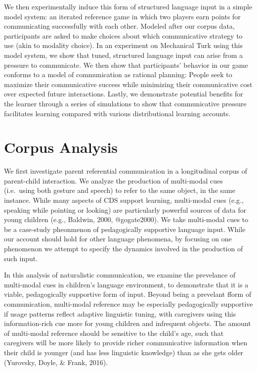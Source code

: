 \documentclass[english,,man,floatsintext]{apa6}
\begin{document}
We then experimentally induce this form of structured language input in a simple model system: an iterated reference game in which two players earn points for communicating successfully with each other. Modeled after our corpus data, participants are asked to make choices about which communicative strategy to use (akin to modality choice). In an experiment on Mechanical Turk using this model system, we show that tuned, structured language input can arise from a pressure to communicate. We then show that participants' behavior in our game conforms to a model of communication as rational planning: People seek to maximize their communicative success while minimizing their communicative cost over expected future interactions. Lastly, we demonstrate potential benefits for the learner through a series of simulations to show that communicative pressure facilitates learning compared with various distributional learning accounts.

\hypertarget{corpus-analysis}{%
\section{Corpus Analysis}\label{corpus-analysis}}

We first investigate parent referential communication in a longitudinal corpus of parent-child interaction. We analyze the production of multi-modal cues (i.e.~using both gesture and speech) to refer to the same object, in the same instance. While many aspects of CDS support learning, multi-modal cues (e.g., speaking while pointing or looking) are particularly powerful sources of data for young children (e.g., Baldwin, 2000, @gogate2000). We take multi-modal cues to be a case-study pheonmenon of pedagogically supportive language input. While our account should hold for other language phenomena, by focusing on one phenomenon we attempt to specify the dynamics involved in the production of such input.

In this analysis of naturalistic communication, we examine the prevelance of multi-modal cues in children's language environment, to demonstrate that it is a viable, pedagogically supportive form of input. Beyond being a prevelant fform of communication, multi-modal reference may be especially pedagogically supportive if usage patterns reflect adaptive linguistic tuning, with caregivers using this information-rich cue more for young children and infrequent objects. The amount of multi-modal reference should be sensitive to the child's age, such that caregivers will be more likely to provide richer communicative information when their child is younger (and has less linguistic knowledge) than as she gets older (Yurovsky, Doyle, \& Frank, 2016).
\end{document}
